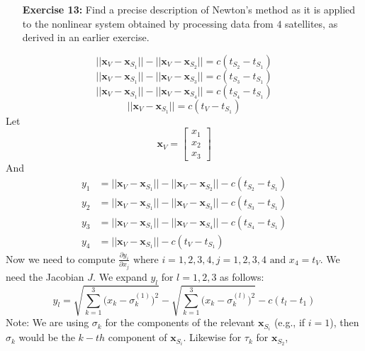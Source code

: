 \documentclass[11pt]{article}
\theoremstyle{definition}
\newcommand{\1}[1]{\mathbf{1} \left \{ #1 \right \}}
\begin{document}
\begin{itemize}
\item[{\textbf{Exercise 13:}}] Find a precise description of Newton's method as it is applied to the nonlinear system obtained by processing data from $4$ satellites, as derived in an earlier exercise.
\end{itemize}
\setcounter{equation}{0}
\begin{equation}
    ||\textbf{x}_V - \textbf{x}_{S_1}|| - ||\textbf{x}_V - \textbf{x}_{S_2}|| = c(t_{S_2} - t_{S_1})
\end{equation}
\begin{equation}
    ||\textbf{x}_V - \textbf{x}_{S_1}|| - ||\textbf{x}_V - \textbf{x}_{S_3}|| = c(t_{S_3} - t_{S_1})
\end{equation}
\begin{equation}
    ||\textbf{x}_V - \textbf{x}_{S_1}|| - ||\textbf{x}_V - \textbf{x}_{S_4}|| = c(t_{S_4} - t_{S_1})
\end{equation}
\begin{equation}
    ||\textbf{x}_V - \textbf{x}_{S_1}|| = c(t_V - t_{S_1})
\end{equation}
Let \[\textbf{x}_V = \begin{bmatrix}
x_1 \\ x_2 \\ x_3 \end{bmatrix}\]
And
\begin{align*}
    y_1 &= ||\textbf{x}_V - \textbf{x}_{S_1}|| - ||\textbf{x}_V - \textbf{x}_{S_2}|| - c(t_{S_2} - t_{S_1}) \\
    y_2 &= ||\textbf{x}_V - \textbf{x}_{S_1}|| - ||\textbf{x}_V - \textbf{x}_{S_3}|| - c(t_{S_3} - t_{S_1}) \\
    y_3 &= ||\textbf{x}_V - \textbf{x}_{S_1}|| - ||\textbf{x}_V - \textbf{x}_{S_4}|| - c(t_{S_4} - t_{S_1}) \\
    y_4 &= ||\textbf{x}_V - \textbf{x}_{S_1}|| - c(t_V - t_{S_1})
\end{align*}
Now we need to compute \(\frac{\partial y_i}{\partial x_j} \text{ where } i = 1, 2, 3, 4,  j = 1, 2, 3, 4 \text{ and } x_4 = t_V\).  We need the Jacobian $J$.  We expand $y_l$ for $l = 1, 2, 3$ as follows:
\begin{equation}
    y_l = \sqrt{\sum_{k=1}^3 \big(x_k - \sigma_k^{(1)}\big)^2} - \sqrt{\sum_{k=1}^3 \big(x_k - \sigma_k^{(l)}\big)^2} - c(t_l - t_1)
\end{equation}
Note: We are using $\sigma_k$ for the components of the relevant $\textbf{x}_{S_i}$ (e.g., if $i = 1$), then $\sigma_k$ would be the $k-th$ component of $\textbf{x}_{S_i}$.  Likewise for $\tau_k$ for $\textbf{x}_{S_2}$,
\end{document}
